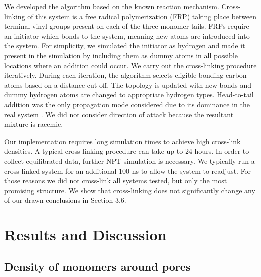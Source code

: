 \documentclass[journal=jpcbfk,manusciprt=article]{achemso}
\begin{document}
  We developed the algorithm based on the known reaction mechanism.
  Cross-linking of this system is a free radical polymerization (FRP) taking
  place between terminal vinyl groups present on each of the three monomer tails.
  FRPs require an initiator which bonds to the system, meaning new atoms are
  introduced into the system. For simplicity, we simulated the initiator as
  hydrogen and made it present in the simulation by including them as dummy atoms
  in all possible locations where an addition could occur. We carry out the
  cross-linking procedure iteratively. During each iteration, the algorithm
  selects eligible bonding carbon atoms based on a distance cut-off. The topology
  is updated with new bonds and dummy hydrogen atoms are changed to appropriate
  hydrogen types.  Head-to-tail addition was the only propagation mode considered
  due to its dominance in the real system \cite{young_introduction_2011}. We did
  not consider direction of attack because the resultant mixture is racemic.

  Our implementation requires long simulation times to achieve high cross-link 
  densities. A typical cross-linking procedure can take up to 24 hours. In
  order to collect equilibrated data, further NPT simulation is necessary. We
  typically run a cross-linked system for an additional 100 ns to allow the system
  to readjust. For those reasons we did not cross-link all systems tested, but only
  the most promising structure. We show that cross-linking does not significantly
  change any of our drawn conclusions in Section 3.6.

  \section{Results and Discussion}
  
  \subsection{Density of monomers around pores}
\end{document}
